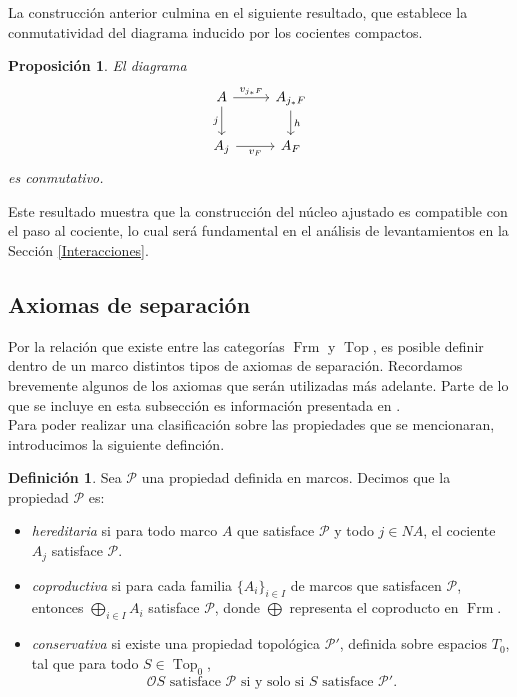 \documentclass[11pt]{amsart}
\DeclareMathOperator{\Frm}{Frm}
\DeclareMathOperator{\Top}{Top}
\theoremstyle{plain}
\newtheorem{prop}[thm]{Proposición}
\theoremstyle{definition}
\newtheorem{dfn}[thm]{Definición}
\begin{document}
La construcción anterior culmina en el siguiente resultado, que establece la conmutatividad del diagrama inducido por los cocientes compactos.
\begin{prop}\label{VFsquare}
El diagrama
\begin{equation}\label{Cuadrado}
    \begin{tikzcd}
	A & {A_{j_*F}} \\
	{A_j} & {A_F}
	\arrow["{v_{j_*F}}", from=1-1, to=1-2]
	\arrow["j"', from=1-1, to=2-1]
	\arrow["h", from=1-2, to=2-2]
	\arrow["{v_F}"', from=2-1, to=2-2]
\end{tikzcd}\end{equation}
es conmutativo.
\end{prop}

Este resultado muestra que la construcción del núcleo ajustado es compatible con el paso al cociente, lo cual será fundamental en el análisis de 
levantamientos en la Sección \ref{Interacciones}.


\subsection{Axiomas de separación}
Por la relación que existe entre las categorías $\Frm$ y $\Top$, es posible definir dentro de un marco distintos tipos de axiomas de separación.
Recordamos brevemente algunos de los axiomas que serán utilizadas más adelante. Parte de lo que se incluye en esta subsección es información presentada en \cite{picado2021separation}.\\

Para poder realizar una clasificación sobre las propiedades que se mencionaran, introducimos la siguiente definción.

\begin{dfn}\label{PropFrm}
Sea $\mathcal{P}$ una propiedad definida en marcos. Decimos que la propiedad $\mathcal{P}$ es:
\begin{itemize}
\item \emph{hereditaria} si para todo marco $A$ que satisface $\mathcal{P}$ y todo $j\in NA$, el cociente $A_j$ satisface $\mathcal{P}$.
\item \emph{coproductiva} si para cada familia $\{A_i\}_{i\in I}$ de marcos que satisfacen $\mathcal{P}$, entonces $\bigoplus_{i\in I}A_i$ satisface $\mathcal{P}$, donde $\bigoplus$ representa el coproducto en $\Frm$.
\item \emph{conservativa} si existe una propiedad topológica $\mathcal{P}'$, definida sobre espacios $T_0$, tal que para todo $S\in \Top_0$,
\[
\mathcal{O}S\text{ satisface }\mathcal{P}\text{ si y solo si }S\text{ satisface }\mathcal{P}'.
\]
\end{itemize}
\end{dfn}
\end{document}
